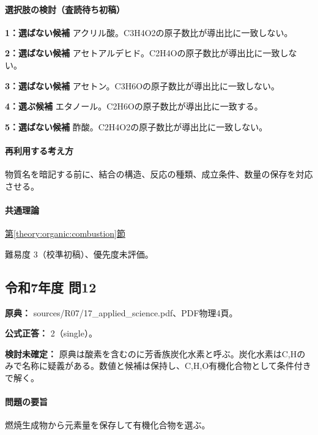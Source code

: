 \paragraph{選択肢の検討（査読待ち初稿）}\mbox{}\par

\noindent\textbf{1：選ばない候補} アクリル酸。C3H4O2の原子数比が導出比に一致しない。\par

\noindent\textbf{2：選ばない候補} アセトアルデヒド。C2H4Oの原子数比が導出比に一致しない。\par

\noindent\textbf{3：選ばない候補} アセトン。C3H6Oの原子数比が導出比に一致しない。\par

\noindent\textbf{4：選ぶ候補} エタノール。C2H6Oの原子数比が導出比に一致する。\par

\noindent\textbf{5：選ばない候補} 酢酸。C2H4O2の原子数比が導出比に一致しない。\par

\paragraph{再利用する考え方} 物質名を暗記する前に、結合の構造、反応の種類、成立条件、数量の保存を対応させる。

\paragraph{共通理論} \hyperref[theory:organic:combustion]{第\ref*{theory:organic:combustion}節}

\par 難易度 3（校準初稿）、優先度未評価。

\subsection{令和7年度 問12}
\label{q:r07-reg-applied-12}

\noindent\textbf{原典：} sources/R07/17\_applied\_science.pdf、PDF物理4頁。

\textbf{公式正答：} 2（single）。

\par\textbf{検討未確定：} 原典は酸素を含むのに芳香族炭化水素と呼ぶ。炭化水素はC,Hのみで名称に疑義がある。数値と候補は保持し、C,H,O有機化合物として条件付きで解く。

\paragraph{問題の要旨} 燃焼生成物から元素量を保存して有機化合物を選ぶ。

